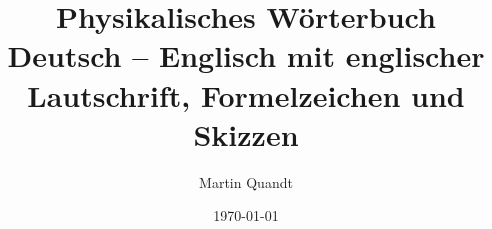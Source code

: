 \newcommand{\skAtom}{\skizze{\draw[thin] (0,0) circle (0.75) circle (1.3); \fill[red] (0,0) circle (0.25); \fill[blue] (40:0.75) circle (3pt) (200:0.75) circle (3pt) (100:1.3) circle (3pt) (300:1.3) circle (3pt);}}
\newcommand{\skKern}{\skizze{\draw[thin, black!40] (0,0) circle (1.2); \foreach \w/\c in {0/red, 60/black!45, 120/red, 180/black!45, 240/red, 300/black!45} {\fill[\c] (\w:0.3) circle (0.17);} \fill[black!45] (0,0) circle (0.17);}}
\newcommand{\skHuelle}{\skizze{\draw[red, very thick] (0,0) circle (0.75) circle (1.3); \fill[black!45] (0,0) circle (0.25);}}
\newcommand{\skZerfall}{\skizze{\achsen{-0.3}{4.4}{-0.3}{2.6}{t}{N}\draw[fig, domain=0:4.1, samples=40] plot (\x,{1.9*exp(-0.693*\x/1.2)});
	\draw[mass, hilf] (0,0.95) -- (1.2,0.95) -- (1.2,0) node[below] {$T_{1/2}$}; \node[left] at (0,1.9) {$N_0$};}}
\newcommand{\skNiveaus}{\skizze{\foreach \y/\n in {0/1, 1.3/2, 1.9/3, 2.2/4} {\draw[fig, thick] (0,\y) -- (2.4,\y) node[right, black] {$n=\n$};}
	\draw[mass, -{Stealth}, decorate, decoration={snake, amplitude=1.2pt, segment length=4pt, post length=3pt}] (1.2,1.3) -- (1.2,0.05);}}
\newcommand{\skSpaltung}{\skizze{\fill[black!45] (-2,0) circle (0.14); \draw[thin, -{Stealth}] (-1.8,0) -- (-1,0); \filldraw[fill=red!35, draw=red, thick] (0,0) circle (0.7);
	\draw[thin, -{Stealth}] (0.9,0.3) -- (1.6,0.7); \draw[thin, -{Stealth}] (0.9,-0.3) -- (1.6,-0.7); \filldraw[fill=red!35, draw=red, thick] (2.1,0.95) circle (0.45) (2.1,-0.95) circle (0.38);}}


\title{Physikalisches Wörterbuch\\[0.3em] \large Deutsch -- Englisch mit englischer Lautschrift, Formelzeichen und Skizzen}
\author{Martin Quandt}
\date{\today}
\pagestyle{plain}
\setlength{\tabcolsep}{4pt}


